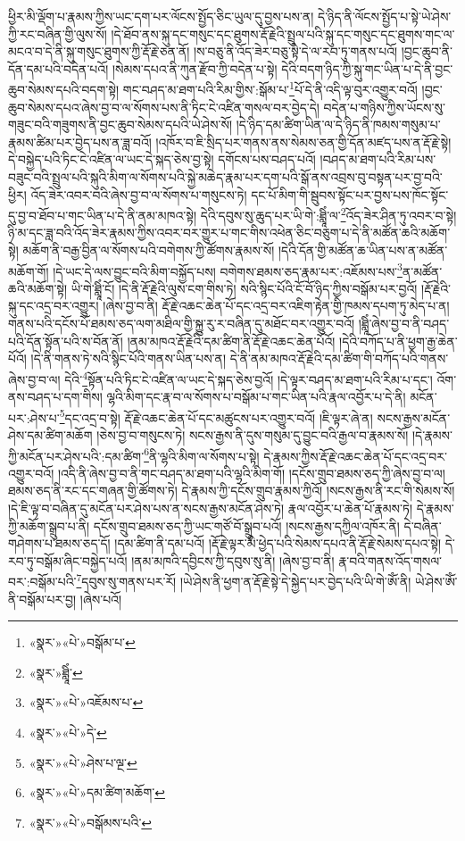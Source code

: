 ཕྱིར་མི་ལྡོག་པ་རྣམས་ཀྱིས་ཡང་དག་པར་ལོངས་སྤྱོད་ཅིང་ཡུལ་དུ་བྱས་པས་ན། དེ་ཉིད་ནི་ལོངས་སྤྱོད་པ་སྟེ་ཡེ་ཤེས་ཀྱི་རང་བཞིན་གྱི་ལུས་སོ། །དེ་ཐོབ་ནས་སྐུ་དང་གསུང་དང་ཐུགས་རྡོ་རྗེའི་སྤྲུལ་པའི་སྐུ་དང་གསུང་དང་ཐུགས་གང་ལ་མངའ་བ་དེ་ནི་སྐུ་གསུང་ཐུགས་ཀྱི་རྡོ་རྗེ་ཅན་ནོ། །ས་བཅུ་ནི་འོད་ཟེར་བཅུ་སྟེ་དེ་ལ་རབ་ཏུ་གནས་པའོ། །བྱང་ཆུབ་ནི་དོན་དམ་པའི་བདེན་པའོ། །སེམས་དཔའ་ནི་ཀུན་རྫོབ་ཀྱི་བདེན་པ་སྟེ། དེའི་བདག་ཉིད་ཀྱི་སྐུ་གང་ཡིན་པ་དེ་ནི་བྱང་ཆུབ་སེམས་དཔའི་བདག་སྟེ། གང་བཤད་མ་ཐག་པའི་རིམ་གྱིས་:སྒོམ་པ་\footnote{«སྣར་»«པེ་»བསྒོམ་པ་}པོ་དེ་ནི་འདི་ལྟ་བུར་འགྱུར་བའོ། །བྱང་ཆུབ་སེམས་དཔའ་ཞེས་བྱ་བ་ལ་སོགས་པས་ནི་ཏིང་ངེ་འཛིན་གསལ་བར་བྱེད་དེ། བདེན་པ་གཉིས་ཀྱིས་ཡོངས་སུ་གཟུང་བའི་གཟུགས་ནི་བྱང་ཆུབ་སེམས་དཔའི་ཡེ་ཤེས་སོ། །དེ་ཉིད་དམ་ཚིག་ཡིན་ལ་དེ་ཉིད་ནི་ཁམས་གསུམ་པ་རྣམས་ཚིམ་པར་བྱེད་པས་ན་ཟླ་བའོ། །འཁོར་བ་ཇི་སྲིད་པར་གནས་ནས་སེམས་ཅན་གྱི་དོན་མཛད་པས་ན་རྡོ་རྗེ་སྟེ། དེ་བསྐྱེད་པའི་ཏིང་ངེ་འཛིན་ལ་ཡང་དེ་སྐད་ཅེས་བྱ་སྟེ། དགོངས་པས་བཤད་པའོ། །བཤད་མ་ཐག་པའི་རིམ་པས་བཟུང་བའི་སྤྲུལ་པའི་སྐུའི་མིག་ལ་སོགས་པའི་སྐྱེ་མཆེད་རྣམ་པར་དག་པའི་སྒོ་ནས་འབྲས་བུ་བསྟན་པར་བྱ་བའི་ཕྱིར། འོད་ཟེར་འབར་བའི་ཞེས་བྱ་བ་ལ་སོགས་པ་གསུངས་ཏེ། དང་པོ་མིག་གི་སྦུབས་སྟོང་པར་བྱས་པས་ཁོང་སྟོང་དུ་བྱ་བ་ཐོབ་པ་གང་ཡིན་པ་དེ་ནི་ནམ་མཁའ་སྟེ། དེའི་དབུས་སུ་ཆུད་པར་ཡི་གེ་:ཐླཱིཾ་ལ་\footnote{«སྣར་»ཐླཱིཾ་}འོད་ཟེར་ཤིན་ཏུ་འབར་བ་སྟེ། ཉི་མ་དང་ཟླ་བའི་འོད་ཟེར་རྣམས་ཀྱིས་འབར་བར་གྱུར་པ་གང་གིས་འཕེན་ཅིང་བཅུག་པ་དེ་ནི་མཚོན་ཆའི་མཆོག་སྟེ། མཆོག་ནི་བརྒྱ་བྱིན་ལ་སོགས་པའི་བགེགས་ཀྱི་ཚོགས་རྣམས་སོ། །དེའི་དོན་གྱི་མཚོན་ཆ་ཡིན་པས་ན་མཚོན་མཆོག་གོ། །དེ་ཡང་དེ་ལས་བྱུང་བའི་མིག་བསྐྱོད་པས། བགེགས་ཐམས་ཅད་རྣམ་པར་:འཇོམས་པས་\footnote{«སྣར་»«པེ་»འཇོམས་པ་}ན་མཚོན་ཆའི་མཆོག་སྟེ། ཡི་གེ་ཐླཱིཾ་ངོ། །དེ་ནི་རྡོ་རྗེའི་ལུས་ངག་གིས་ཏེ། སའི་སྙིང་པོའི་ངོ་བོ་ཉིད་ཀྱིས་བསྒོམ་པར་བྱའོ། །རྡོ་རྗེའི་སྐུ་དང་འདྲ་བར་འགྱུར། །ཞེས་བྱ་བ་ནི། རྡོ་རྗེ་འཆང་ཆེན་པོ་དང་འདྲ་བར་འཇིག་རྟེན་གྱི་ཁམས་དཔག་ཏུ་མེད་པ་ན། གནས་པའི་དངོས་པོ་ཐམས་ཅད་ལག་མཐིལ་གྱི་སྐྱུ་རུ་ར་བཞིན་དུ་མཐོང་བར་འགྱུར་བའོ། །ཐླཱིཾ་ཞེས་བྱ་བ་ནི་བཤད་པའི་དོན་སྟོན་པའི་ས་བོན་ནོ། །ནམ་མཁའ་རྡོ་རྗེའི་དམ་ཚིག་ནི་རྡོ་རྗེ་འཆང་ཆེན་པོའོ། །དེའི་བཀོད་པ་ནི་ཕྱག་རྒྱ་ཆེན་པོའོ། །དེ་ནི་གནས་ཏེ་སའི་སྙིང་པོའི་གནས་ཡིན་པས་ན། དེ་ནི་ནམ་མཁའ་རྡོ་རྗེའི་དམ་ཚིག་གི་བཀོད་པའི་གནས་ཞེས་བྱ་བ་ལ། དེའི་\footnote{«སྣར་»«པེ་»དེ་}སྟོན་པའི་ཏིང་ངེ་འཛིན་ལ་ཡང་དེ་སྐད་ཅེས་བྱའོ། །དེ་ལྟར་བཤད་མ་ཐག་པའི་རིམ་པ་དང་། འོག་ནས་བཤད་པ་དག་གིས། ལྷའི་མིག་དང་རྣ་བ་ལ་སོགས་པ་བསྒོམ་པ་གང་ཡིན་པའི་རྣལ་འབྱོར་པ་དེ་ནི། མངོན་པར་:ཤེས་པ་\footnote{«སྣར་»«པེ་»ཤེས་པ་ལྔ་}དང་འདྲ་བ་སྟེ། རྡོ་རྗེ་འཆང་ཆེན་པོ་དང་མཚུངས་པར་འགྱུར་བའོ། །ཇི་ལྟར་ཞེ་ན། སངས་རྒྱས་མངོན་ཤེས་དམ་ཚིག་མཆོག །ཅེས་བྱ་བ་གསུངས་ཏེ། སངས་རྒྱས་ནི་དུས་གསུམ་དུ་བྱུང་བའི་རྒྱལ་བ་རྣམས་སོ། །དེ་རྣམས་ཀྱི་མངོན་པར་ཤེས་པའི་:དམ་ཚིག་\footnote{«སྣར་»«པེ་»དམ་ཚིག་མཆོག་}ནི་ལྷའི་མིག་ལ་སོགས་པ་སྟེ། དེ་རྣམས་ཀྱིས་རྡོ་རྗེ་འཆང་ཆེན་པོ་དང་འདྲ་བར་འགྱུར་བའོ། །འདི་ནི་ཞེས་བྱ་བ་ནི་གང་བཤད་མ་ཐག་པའི་ལྷའི་མིག་གོ། །དངོས་གྲུབ་ཐམས་ཅད་ཀྱི་ཞེས་བྱ་བ་ལ། ཐམས་ཅད་ནི་རང་དང་གཞན་གྱི་ཚོགས་ཏེ། དེ་རྣམས་ཀྱི་དངོས་གྲུབ་རྣམས་ཀྱིའོ། །སངས་རྒྱས་ནི་རང་གི་སེམས་སོ། །དེ་ཇི་ལྟ་བ་བཞིན་དུ་མངོན་པར་ཤེས་པས་ན་སངས་རྒྱས་མངོན་ཤེས་ཏེ། རྣལ་འབྱོར་པ་ཆེན་པོ་རྣམས་ཏེ། དེ་རྣམས་ཀྱི་མཆོག་སྒྲུབ་པ་ནི། དངོས་གྲུབ་ཐམས་ཅད་ཀྱི་ཡང་གཙོ་བོ་སྒྲུབ་པའོ། །སངས་རྒྱས་དཀྱིལ་འཁོར་ནི། དེ་བཞིན་གཤེགས་པ་ཐམས་ཅད་དོ། །དམ་ཚིག་ནི་དམ་པའོ། །རྡོ་རྗེ་ལྟར་མི་ཕྱེད་པའི་སེམས་དཔའ་ནི་རྡོ་རྗེ་སེམས་དཔའ་སྟེ། དེ་རབ་ཏུ་བསྒོམ་ཞིང་བསྐྱེད་པའོ། །ནམ་མཁའི་དབྱིངས་ཀྱི་དབུས་སུ་ནི། །ཞེས་བྱ་བ་ནི། རྣ་བའི་གནས་འོད་གསལ་བར་:བསྒོམ་པའི་\footnote{«སྣར་»«པེ་»བསྒོམས་པའི་}དབུས་སུ་གནས་པར་རོ། །ཡེ་ཤེས་ནི་ཕྱག་ན་རྡོ་རྗེ་སྟེ་དེ་སྐྱེད་པར་བྱེད་པའི་ཡི་གེ་ཨོཾ་ནི། ཡེ་ཤེས་ཨོཾ་ནི་བསྒོམ་པར་བྱ། །ཞེས་པའོ། 